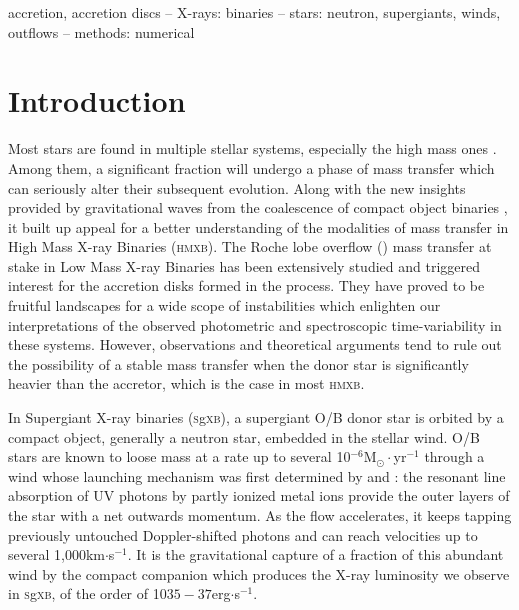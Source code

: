 \documentclass[a4paper,fleqn,usenatbib]{mnras}
\makeatletter
\newcommand{\sgx}{\textsc{s}g\textsc{xb}\xspace}
\newcommand*{\hmxb}{\textsc{hmxb}\@\xspace}
\makeatother
\begin{document}
\begin{keywords}
accretion, accretion discs -- X-rays: binaries -- stars: neutron, supergiants, winds, outflows -- methods: numerical 
\end{keywords}



\section{Introduction}
\label{sec:intro}

Most stars are found in multiple stellar systems, especially the high mass ones \citep{Duchene2013}. Among them, a significant fraction will undergo a phase of mass transfer which can seriously alter their subsequent evolution. Along with the new insights provided by gravitational waves from the coalescence of compact object binaries \citep{Abbott2016a}, it built up appeal for a better understanding of the modalities of mass transfer in High Mass X-ray Binaries (\hmxb). The Roche lobe overflow (\rlof) mass transfer at stake in Low Mass X-ray Binaries has been extensively studied and triggered interest for the accretion disks formed in the process. They have proved to be fruitful landscapes for a wide scope of instabilities which enlighten our interpretations of the observed photometric and spectroscopic time-variability in these systems. However, observations and theoretical arguments tend to rule out the possibility of a stable \rlof mass transfer when the donor star is significantly heavier than the accretor, which is the case in most \hmxb. 

In Supergiant X-ray binaries (\sgx), a supergiant O/B donor star is orbited by a compact object, generally a neutron star, embedded in the stellar wind. O/B stars are known to loose mass at a rate up to several 10$^{-6}$M$_{\odot}\cdot$yr$^{-1}$ through a wind whose launching mechanism was first determined by \cite{Lucy1970} and \cite{Castor1975} : the resonant line absorption of UV photons by partly ionized metal ions provide the outer layers of the star with a net outwards momentum. As the flow accelerates, it keeps tapping previously untouched Doppler-shifted photons and can reach velocities up to several 1,000km$\cdot$s$^{-1}$. It is the gravitational capture of a fraction of this abundant wind by the compact companion which produces the X-ray luminosity we observe in \sgx, of the order of 10${35-37}$erg$\cdot$s$^{-1}$.
\end{document}
